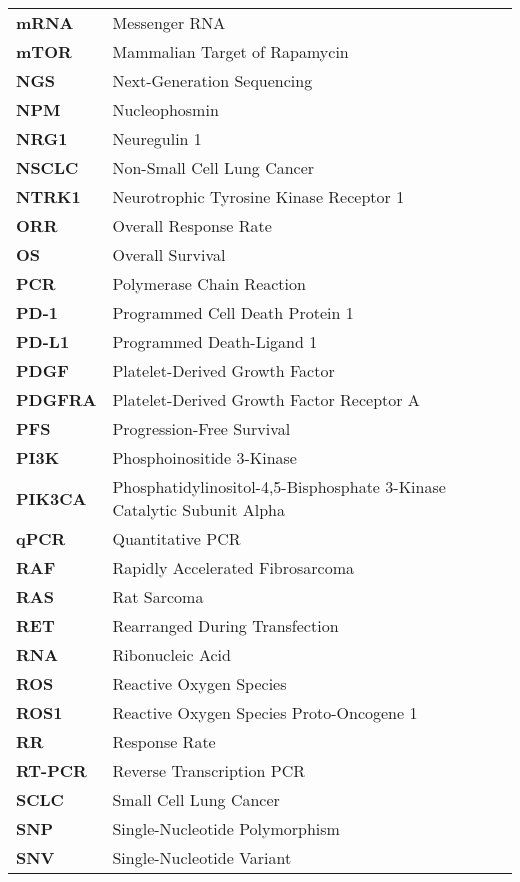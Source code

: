 \begin{longtable}[l]{l l}
    \textbf{mRNA} & Messenger RNA \\
    \textbf{mTOR} & Mammalian Target of Rapamycin \\
    \textbf{NGS} & Next-Generation Sequencing \\
    \textbf{NPM} & Nucleophosmin \\
    \textbf{NRG1} & Neuregulin 1 \\
    \textbf{NSCLC} & Non-Small Cell Lung Cancer \\
    \textbf{NTRK1} & Neurotrophic Tyrosine Kinase Receptor 1 \\
    \textbf{ORR} &  Overall Response Rate \\
    \textbf{OS} & Overall Survival \\
    \textbf{PCR} & Polymerase Chain Reaction \\
    \textbf{PD-1} & Programmed Cell Death Protein 1 \\
    \textbf{PD-L1} & Programmed Death-Ligand 1 \\
    \textbf{PDGF} & Platelet-Derived Growth Factor \\
    \textbf{PDGFRA} & Platelet-Derived Growth Factor Receptor A \\
    \textbf{PFS} & Progression-Free Survival \\
    \textbf{PI3K} & Phosphoinositide 3-Kinase \\
    \textbf{PIK3CA} & Phosphatidylinositol-4,5-Bisphosphate 3-Kinase Catalytic Subunit Alpha \\
    \textbf{qPCR} & Quantitative PCR \\
    \textbf{RAF} & Rapidly Accelerated Fibrosarcoma \\
    \textbf{RAS} & Rat Sarcoma \\
    \textbf{RET} & Rearranged During Transfection \\
    \textbf{RNA} & Ribonucleic Acid \\
    \textbf{ROS} & Reactive Oxygen Species \\
    \textbf{ROS1} & Reactive Oxygen Species Proto-Oncogene 1 \\
    \textbf{RR} & Response Rate \\
    \textbf{RT-PCR} & Reverse Transcription PCR \\
    \textbf{SCLC} & Small Cell Lung Cancer \\
    \textbf{SNP} & Single-Nucleotide Polymorphism \\
    \textbf{SNV} & Single-Nucleotide Variant \\

\end{longtable}
